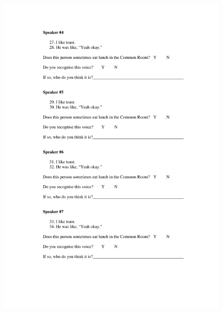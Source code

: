 \begin{figure}
	\centering
		\includegraphics[width=5in]{images/Exp3page6.pdf}
		\label{x3p6}
\end{figure}

